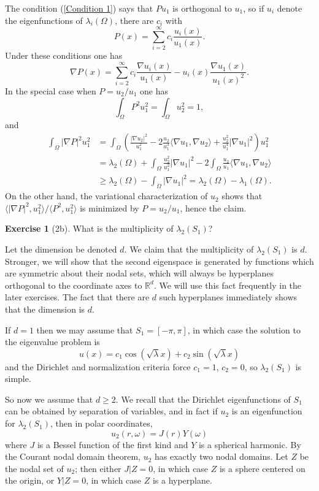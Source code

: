 \documentclass[10pt]{article}
\newcommand{\RR}{\mathbb{R}}
\theoremstyle{definition}
\newtheorem{exer}{Exercise}
\begin{document}
The condition (\ref{Condition 1}) says that $Pu_1$ is orthogonal to $u_1$, so if $u_i$ denote the eigenfunctions of $\lambda_i(\Omega)$, there are $c_i$ with
$$P(x) = \sum_{i=2}^\infty c_i \frac{u_i(x)}{u_1(x)}.$$
Under these conditions one has
$$\nabla P(x) = \sum_{i=2}^\infty c_i \frac{\nabla u_i(x)}{u_1(x)} - u_i(x) \frac{\nabla u_1(x)}{u_1(x)^2}.$$
In the special case when $P = u_2/u_1$ one has
$$\int_\Omega P^2 u_1^2 = \int_\Omega u_2^2 = 1,$$
and
\begin{align*}
\int_\Omega |\nabla P|^2 u_1^2 &= \int_\Omega \left(\frac{|\nabla u_2|^2}{u_1^2} - 2 \frac{u_2}{u_1^3} \langle \nabla u_1, \nabla u_2\rangle + \frac{u_2^2}{u_1^4} |\nabla u_1|^2 \right) u_1^2\\
&= \lambda_2(\Omega) + \int_\Omega \frac{u_2^2}{u_1^2} |\nabla u_1|^2 - 2\int_\Omega \frac{u_2}{u_1} \langle \nabla u_1, \nabla u_2\rangle\\
&\geq \lambda_2(\Omega) - \int_\Omega |\nabla u_1|^2 = \lambda_2(\Omega) - \lambda_1(\Omega).
\end{align*}
On the other hand, the variational characterization of $u_2$ shows that $\langle |\nabla P|^2, u_1^2\rangle/\langle P^2, u_1^2\rangle$ is minimized by $P = u_2/u_1$, hence the claim.

\begin{exer}[2b]
What is the multiplicity of $\lambda_2(S_1)$?
\end{exer}

Let the dimension be denoted $d$.
We claim that the multiplicity of $\lambda_2(S_1)$ is $d$.
Stronger, we will show that the second eigenspace is generated by functions which are symmetric about their nodal sets, which will always be hyperplanes orthogonal to the coordinate axes to $\RR^d$.
We will use this fact frequently in the later exercises.
The fact that there are $d$ such hyperplanes immediately shows that the dimension is $d$.

If $d = 1$ then we may assume that $S_1 = [-\pi, \pi]$, in which case the solution to the eigenvalue problem is
$$u(x) = c_1 \cos(\sqrt \lambda x) + c_2 \sin(\sqrt \lambda x)$$
and the Dirichlet and normalization criteria force $c_1 = 1$, $c_2 = 0$, so $\lambda_2(S_1)$ is simple.

So now we assume that $d \geq 2$.
We recall that the Dirichlet eigenfunctions of $S_1$ can be obtained by separation of variables, and in fact if $u_2$ is an eigenfunction for $\lambda_2(S_1)$, then in polar coordinates,
$$u_2(r, \omega) = J(r) Y(\omega)$$
where $J$ is a Bessel function of the first kind and $Y$ is a spherical harmonic.
By the Courant nodal domain theorem, $u_2$ has exactly two nodal domains.
Let $Z$ be the nodal set of $u_2$; then either $J|Z = 0$, in which case $Z$ is a sphere centered on the origin, or $Y|Z = 0$, in which case $Z$ is a hyperplane.
\end{document}
